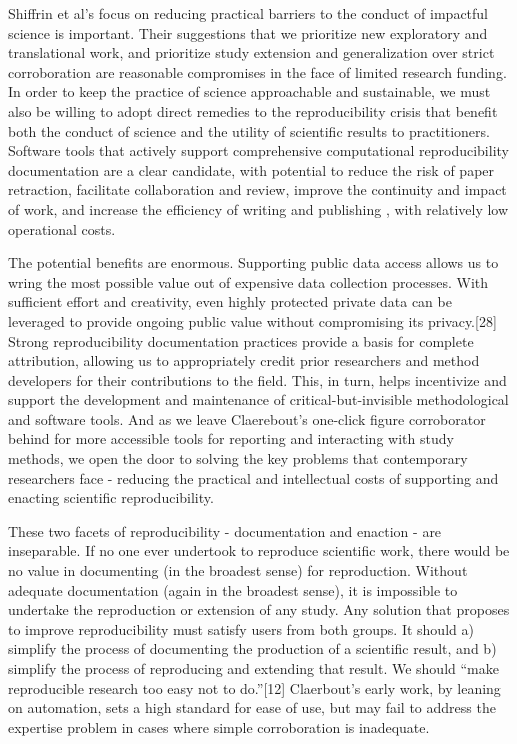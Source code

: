 Shiffrin et al’s focus on reducing practical barriers to the conduct of
impactful science is important. Their suggestions that we prioritize new
exploratory and translational work, and prioritize study extension and
generalization over strict corroboration are reasonable compromises in the face
of limited research funding. In order to keep the practice of science
approachable and sustainable, we must also be willing to adopt direct remedies
to the reproducibility crisis that benefit both the conduct of science and the
utility of scientific results to practitioners. Software tools that actively
support comprehensive computational reproducibility documentation are a clear
candidate, with potential to reduce the risk of paper retraction, facilitate
collaboration and review, improve the continuity and impact of work, and
increase the efficiency of writing and publishing \parencite{community_added_2021},
with relatively low operational costs.

The potential benefits are enormous. Supporting public data access allows us to
wring the most possible value out of expensive data collection processes. With
sufficient effort and creativity, even highly protected private data can be
leveraged to provide ongoing public value without compromising its privacy.[28]
Strong reproducibility documentation practices provide a basis for complete
attribution, allowing us to appropriately credit prior researchers and method
developers for their contributions to the field. This, in turn, helps
incentivize and support the development and maintenance of
critical-but-invisible methodological and software tools. And as we leave
Claerebout’s one-click figure corroborator behind for more accessible tools for
reporting and interacting with study methods, we open the door to solving the
key problems that contemporary researchers face - reducing the practical and
intellectual costs of supporting and enacting scientific reproducibility.

These two facets of reproducibility - documentation and enaction - are
inseparable. If no one ever undertook to reproduce scientific work, there would
be no value in documenting (in the broadest sense) for reproduction. Without
adequate documentation (again in the broadest sense), it is impossible to
undertake the reproduction or extension of any study. Any solution that proposes
to improve reproducibility must satisfy users from both groups. It should a)
simplify the process of documenting the production of a scientific result, and
b) simplify the process of reproducing and extending that result. We should
“make reproducible research too easy not to do.”[12] Claerbout’s early work, by
leaning on automation, sets a high standard for ease of use, but may fail to
address the expertise problem in cases where simple corroboration is inadequate.

